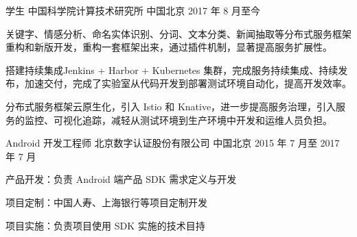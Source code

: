 

\begin{cventries}

  \cventry
    {学生} %
    {中国科学院计算技术研究所} %
    {中国北京} %
    {2017 年 8 月至今} %
    {
      \begin{cvitems} %
        \item 关键字、情感分析、命名实体识别、分词、文本分类、新闻抽取等分布式服务框架重构和新版开发，重构一套框架出来，通过插件机制，显著提高服务扩展性。
        \item 搭建持续集成Jenkins + Harbor + Kubernetes 集群，完成服务持续集成、持续发布，加速交付，完成了实验室从代码开发到部署测试环境自动化，提高开发效率。
        \item 分布式服务框架云原生化，引入 Istio 和 Knative，进一步提高服务治理，引入服务的监控、可视化追踪，减轻从测试环境到生产环境中开发和运维人员负担。
      \end{cvitems}
    }

  \cventry
    {Android 开发工程师} %
    {北京数字认证股份有限公司} %
    {中国北京} %
    {2015 年 7 月至 2017 年 7 月} %
    {
      \begin{cvitems} %
        \item 产品开发：负责 Android 端产品 SDK 需求定义与开发
        \item 项目定制：中国人寿、上海银行等项目定制开发
        \item 项目实施：负责项目使用 SDK 实施的技术目持
      \end{cvitems}
    }

\end{cventries}
